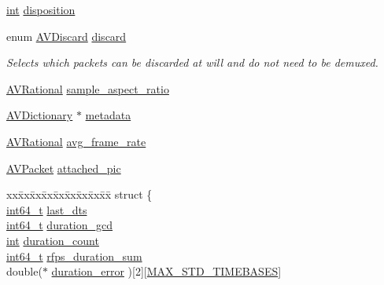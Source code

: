 \begin{DoxyCompactItemize}
\hyperlink{xmltok_8h_a5a0d4a5641ce434f1d23533f2b2e6653}{int} \hyperlink{struct_a_v_stream_aea05abdb8e45405048d7923a68c23ef5}{disposition}
\item 
enum \hyperlink{group__lavc__decoding_ga352363bce7d3ed82c101b3bc001d1c16}{A\+V\+Discard} \hyperlink{struct_a_v_stream_a492fcecc45dbbd8da51edd0124e9dd30}{discard}
\begin{DoxyCompactList}\small\item\em Selects which packets can be discarded at will and do not need to be demuxed. \end{DoxyCompactList}\item 
\hyperlink{struct_a_v_rational}{A\+V\+Rational} \hyperlink{struct_a_v_stream_a3f19c60ac6da237cd10e4d97150c118e}{sample\+\_\+aspect\+\_\+ratio}
\item 
\hyperlink{group__lavu__dict_ga1d7cc0833bee918994a600556410315f}{A\+V\+Dictionary} $\ast$ \hyperlink{struct_a_v_stream_a50d250a128a3da9ce3d135e84213fb82}{metadata}
\item 
\hyperlink{struct_a_v_rational}{A\+V\+Rational} \hyperlink{struct_a_v_stream_a946e1e9b89eeeae4cab8a833b482c1ad}{avg\+\_\+frame\+\_\+rate}
\item 
\hyperlink{struct_a_v_packet}{A\+V\+Packet} \hyperlink{struct_a_v_stream_a8c689ee00c0dfe4313891f8a2ea21f4d}{attached\+\_\+pic}
\item 
\begin{tabbing}
xx\=xx\=xx\=xx\=xx\=xx\=xx\=xx\=xx\=\kill
struct \{\\
\>\hyperlink{lib-src_2ffmpeg_2win32_2stdint_8h_a67a9885ef4908cb72ce26d75b694386c}{int64\_t} \hyperlink{struct_a_v_stream_a1c89d3d6eedba5bab6e3e12f0d6fb70e}{last\_dts}\\
\>\hyperlink{lib-src_2ffmpeg_2win32_2stdint_8h_a67a9885ef4908cb72ce26d75b694386c}{int64\_t} \hyperlink{struct_a_v_stream_a0074e905c9fdbd79d2ecd623361ec4f8}{duration\_gcd}\\
\>\hyperlink{xmltok_8h_a5a0d4a5641ce434f1d23533f2b2e6653}{int} \hyperlink{struct_a_v_stream_ab1dc61f4f5b3bd8e1211c022aa04d588}{duration\_count}\\
\>\hyperlink{lib-src_2ffmpeg_2win32_2stdint_8h_a67a9885ef4908cb72ce26d75b694386c}{int64\_t} \hyperlink{struct_a_v_stream_afeec9883900710b1e9fc241dd6c32a20}{rfps\_duration\_sum}\\
\>double($\ast$ \hyperlink{struct_a_v_stream_a5364ec3acec412b24d225152cf1c0fd6}{duration\_error} )\mbox{[}2\mbox{]}\mbox{[}\hyperlink{avformat_8h_a79d6ee9e699fd534e85543752f3cb775}{MAX\_STD\_TIMEBASES}\mbox{]}\\

\end{tabbing}
\end{DoxyCompactItemize}
